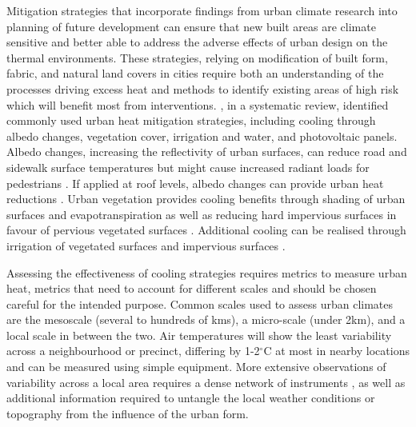\documentclass[final,3p,times,authoryear]{elsarticle}
\begin{document}
Mitigation strategies that incorporate findings from urban climate research into planning of future development can ensure that new built areas are climate sensitive and better able to address the adverse effects of urban design on the thermal environments. These strategies, relying on modification of built form, fabric, and natural land covers in cities require both an understanding of the processes driving excess heat and methods to identify existing areas of high risk which will benefit most from interventions. \cite{Krayenhoff2021}, in a systematic review, identified commonly used urban heat mitigation strategies, including cooling through albedo changes, vegetation cover, irrigation and water, and photovoltaic panels. Albedo changes, increasing the reflectivity of urban surfaces, can reduce road and sidewalk surface temperatures but might cause increased radiant loads for pedestrians \citep{Middel2020}. If applied at roof levels, albedo changes can provide urban heat reductions \citep{Jacobs2018Roof}. Urban vegetation provides cooling benefits through shading of urban surfaces and evapotranspiration \citep{Bowler2010,Coutts2012,Coutts2015} as well as reducing hard impervious surfaces in favour of pervious vegetated surfaces \citep{Middel2019a}. Additional cooling can be realised through irrigation of vegetated surfaces \citep{Broadbent2017a,Cheung2021} and impervious surfaces \citep{Hendel2016,Solcerova2018}.

Assessing the effectiveness of cooling strategies requires metrics to measure urban heat, metrics that need to account for different scales and should be chosen careful for the intended purpose. Common scales used to assess urban climates are the mesoscale (several to hundreds of kms), a micro-scale (under 2km),  and a local scale in between the two. Air temperatures will show the least variability across a neighbourhood or precinct, differing by 1-2$^{\circ}$C   at most in nearby locations \citep{Coutts2015} and can be measured using simple equipment. More extensive observations of variability across a local area requires a dense network of instruments \citep{Potgieter2021}, as well as additional information required to untangle the local weather conditions or topography from the influence of the urban form. 
\end{document}

